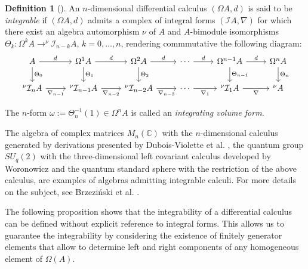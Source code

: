 \documentclass{amsart}
\theoremstyle{definition}
\newtheorem{definition}[theorem]{Definition}
\theoremstyle{remark}
\numberwithin{equation}{section}
\begin{document}
\begin{definition}[{\cite[Definition 2.1]{BrzezinskiSitarz2017}}]
An $n$-dimensional differential calculus $(\Omega A, d)$ is said to be {\em integrable} if $(\Omega A, d)$ admits a complex of integral forms $(\mathcal{I}A, \nabla)$ for which there exist an algebra automorphism $\nu$ of $A$ and $A$-bimodule isomorphisms \linebreak $\Theta_k: \Omega^{k} A \to ^{\nu} \mathcal{I}_{n-k}A$, $k = 0, \dotsc, n$, rendering commmutative the following diagram:
\[
\begin{tikzcd}
A \arrow{r}{d} \arrow{d}{\Theta_0} & \Omega^{1} A \arrow{d}{\Theta_1} \arrow{r}{d} & \Omega^2 A  \arrow{d}{\Theta_2} \arrow{r}{d} & \dotsb \arrow{r}{d} & \Omega^{n-1} A \arrow{d}{\Theta_{n-1}} \arrow{r}{d} & \Omega^n A  \arrow{d}{\Theta_n} \\ ^{\nu} \mathcal{I}_n A \arrow[swap]{r}{\nabla_{n-1}} & ^{\nu} \mathcal{I}_{n-1} A \arrow[swap]{r}{\nabla_{n-2}} & ^{\nu} \mathcal{I}_{n-2} A \arrow[swap]{r}{\nabla_{n-3}} & \dotsb \arrow[swap]{r}{\nabla_{1}} & ^{\nu} \mathcal{I}_{1} A \arrow[swap]{r}{\nabla} & ^{\nu} A
\end{tikzcd}
\]

The $n$-form $\omega:= \Theta_n^{-1}(1)\in \Omega^n A$ is called an {\em integrating volume form}. 
\end{definition}

The algebra of complex matrices $M_n(\mathbb{C})$ with the $n$-dimensional calculus generated by derivations presented by Dubois-Violette et al. \cite{DuboisViolette1988, DuboisVioletteKernerMadore1990}, the quantum group $SU_q(2)$ with the three-dimensional left covariant calculus developed by Woronowicz \cite{Woronowicz1987} and the quantum standard sphere with the restriction of the above calculus, are examples of algebras admitting integrable calculi. For more details on the subject, see Brzezi\'nski et al. \cite{BrzezinskiElKaoutitLomp2010}. 

The following proposition shows that the integrability of a differential calculus can be defined without explicit reference to integral forms. This allows us to guarantee the integrability by considering the existence of finitely generator elements that allow to determine left and right components of any homogeneous element of $\Omega(A)$.
\end{document}

